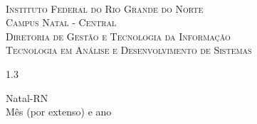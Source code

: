 
\begin{titlepage}
	\begin{center}
		
		  
		\begin{minipage}{11.15cm}
			\begin{center}
				\begin{espacosimples}
					{\small \ \\
                       \textsc{Instituto Federal do Rio Grande do Norte}
                       \\
							  \textsc{Campus Natal - Central}					\\
							  \textsc{Diretoria de Gestão e Tecnologia da Informação}	   
							  \\
							  \textsc{Tecnologia em Análise e Desenvolvimento de Sistemas}}   	
                       \\
				\end{espacosimples}
			\end{center}
		\end{minipage}

			
		\vspace{6cm}
						
		{\setlength{\baselineskip}%
		{1.3\baselineskip}
		{\LARGE \textbf{\myThesis}}\par}
			
		\vspace{3cm}
			
		{\large \textbf{\myName}}
						
		\vspace{6cm}
		
		Natal-RN\\Mês (por extenso) e ano
	\end{center}
\end{titlepage}
